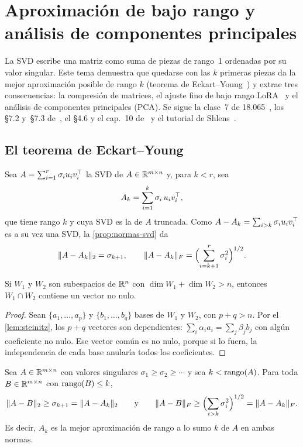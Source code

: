 \chapter{Aproximación de bajo rango y análisis de componentes principales}
\label{tema:5}

La SVD escribe una matriz como suma de piezas de rango~1 ordenadas por su valor singular. Este tema demuestra que quedarse con las $k$ primeras piezas da la mejor aproximación posible de rango $k$ (teorema de Eckart--Young~\cite{eckart-young}) y extrae tres consecuencias: la compresión de matrices, el ajuste fino de bajo rango LoRA~\cite{hu-lora} y el análisis de componentes principales (PCA). Se sigue la clase~7 de 18.065~\cite{mit18065}, los §7.2 y~§7.3 de~\cite{strang-ila}, el §4.6 y el cap.~10 de~\cite{mml} y el tutorial de Shlens~\cite{shlens}.

\section{El teorema de Eckart--Young}

Sea $A=\sum_{i=1}^{r}\sigma_iu_iv_i^{\top}$ la SVD de $A\in\mathbb{R}^{m\times n}$ y, para $k<r$, sea
\[
A_k=\sum_{i=1}^{k}\sigma_i\,u_iv_i^{\top},
\]
que tiene rango $k$ y cuya SVD es la de $A$ truncada. Como $A-A_k=\sum_{i>k}\sigma_iu_iv_i^{\top}$ es a su vez una SVD, la \cref{prop:normas-svd} da
\[
\lVert A-A_k\rVert_2=\sigma_{k+1},\qquad \lVert A-A_k\rVert_F=\Bigl(\sum_{i=k+1}^{r}\sigma_i^{2}\Bigr)^{1/2}.
\]

\begin{lema}\label{lem:interseccion}
Si $W_1$ y $W_2$ son subespacios de $\mathbb{R}^{n}$ con $\dim W_1+\dim W_2>n$, entonces $W_1\cap W_2$ contiene un vector no nulo.
\end{lema}

\begin{proof}
Sean $\{a_1,\dots,a_p\}$ y $\{b_1,\dots,b_q\}$ bases de $W_1$ y $W_2$, con $p+q>n$. Por el \cref{lem:steinitz}, los $p+q$ vectores son dependientes: $\sum_i\alpha_ia_i=\sum_j\beta_jb_j$ con algún coeficiente no nulo. Ese vector común es no nulo, porque si lo fuera, la independencia de cada base anularía todos los coeficientes.
\end{proof}

\begin{teorema}\label{teo:eckart-young}
Sea $A\in\mathbb{R}^{m\times n}$ con valores singulares $\sigma_1\ge\sigma_2\ge\cdots$ y sea $k<\operatorname{rango}(A)$. Para toda $B\in\mathbb{R}^{m\times n}$ con $\operatorname{rango}(B)\le k$,
\[
\lVert A-B\rVert_2\ge\sigma_{k+1}=\lVert A-A_k\rVert_2
\qquad\text{y}\qquad
\lVert A-B\rVert_F\ge\Bigl(\sum_{i>k}\sigma_i^{2}\Bigr)^{1/2}=\lVert A-A_k\rVert_F.
\]
Es decir, $A_k$ es la mejor aproximación de rango a lo sumo $k$ de $A$ en ambas normas.
\end{teorema}

